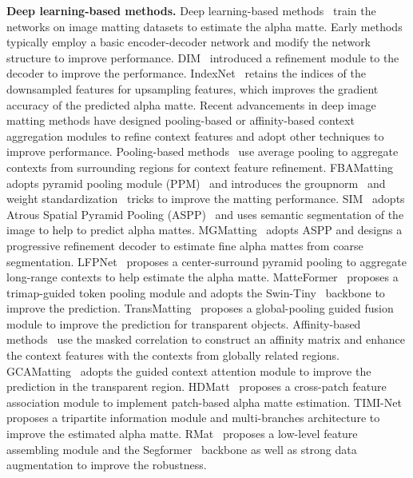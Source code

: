 \documentclass[10pt,twocolumn,letterpaper]{article}
\begin{document}
\noindent \textbf{Deep learning-based methods.}
Deep learning-based methods~\cite{xu2017deep,2018AlphaGAN,li2020natural,forte2020fbamatting,sun2021sim,cai2019disentangled,tang2019very,2021Prior,wang2021ImprovingDeepImageMatting,dai2021learning,2020Context} train the networks on image matting datasets to estimate the alpha matte.
Early methods~\cite{xu2017deep,lu2019indices} typically employ a basic encoder-decoder network and modify the network structure to improve performance. 
DIM~\cite{xu2017deep} introduced a refinement module to the decoder to improve the performance.
IndexNet~\cite{lu2019indices} retains the indices of the downsampled features for upsampling features, which improves the gradient accuracy of the predicted alpha matte.
Recent advancements in deep image matting methods have designed pooling-based or affinity-based context aggregation modules to refine context features and adopt other techniques to improve performance. 
Pooling-based methods~\cite{forte2020fbamatting,yu2020mask,sun2021sim,liu2021lfpnet,park2022matteformer,cai2022TransMatting} use average pooling to aggregate contexts from surrounding regions for context feature refinement.
FBAMatting~\cite{forte2020fbamatting} adopts pyramid pooling module (PPM)~\cite{Zhao2016Pyramid} and introduces the groupnorm~\cite{wu2018group} and weight standardization~\cite{weightstandardization} tricks to improve the matting performance.
SIM~\cite{sun2021sim} adopts Atrous Spatial Pyramid Pooling (ASPP)~\cite{chen2018deeplab} and uses semantic segmentation of the image to help to predict alpha mattes.
MGMatting~\cite{yu2020mask} adopts ASPP and designs a progressive refinement decoder to estimate fine alpha mattes from coarse segmentation.
LFPNet~\cite{liu2021lfpnet} proposes a center-surround pyramid pooling to aggregate long-range contexts to help estimate the alpha matte.
MatteFormer~\cite{park2022matteformer} proposes a trimap-guided token pooling module and adopts the Swin-Tiny~\cite{liu2021Swin} backbone to improve the prediction.
TransMatting~\cite{cai2022TransMatting} proposes a global-pooling guided fusion module to improve the prediction for transparent objects.
Affinity-based methods~\cite{li2020natural,yu2020high,Yu_2021_ICCV,dai2022boosting} use the masked correlation to construct an affinity matrix and enhance the context features with the contexts from globally related regions. 
GCAMatting~\cite{li2020natural} adopts the guided context attention module to improve the prediction in the transparent region.
HDMatt~\cite{yu2020high} proposes a cross-patch feature association module to implement patch-based alpha matte estimation.
TIMI-Net~\cite{Liu_2021_ICCV} proposes a tripartite information module and multi-branches architecture to improve the estimated alpha matte.
RMat~\cite{dai2022boosting} proposes a low-level feature assembling module and the Segformer~\cite{xie2021segformer} backbone as well as strong data augmentation to improve the robustness.
\end{document}
